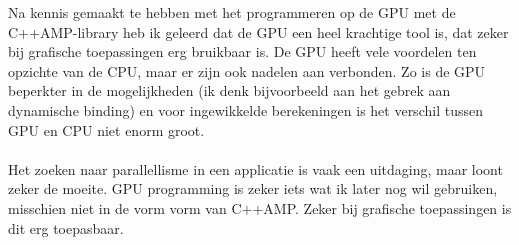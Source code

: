 \documentclass[12pt]{article}
\begin{document}
Na kennis gemaakt te hebben met het programmeren op de GPU met de C++AMP-library heb ik geleerd dat de GPU een heel krachtige tool is, dat zeker bij grafische toepassingen erg bruikbaar is.
De GPU heeft vele voordelen ten opzichte van de CPU, maar er zijn ook nadelen aan verbonden.
Zo is de GPU beperkter in de mogelijkheden (ik denk bijvoorbeeld aan het gebrek aan dynamische binding) en voor ingewikkelde berekeningen is het verschil tussen GPU en CPU niet enorm groot.
\\ \\
Het zoeken naar parallellisme in een applicatie is vaak een uitdaging, maar loont zeker de moeite.
GPU programming is zeker iets wat ik later nog wil gebruiken, misschien niet in de vorm vorm van C++AMP.
Zeker bij grafische toepassingen is dit erg toepasbaar.
\fi
\end{document}
